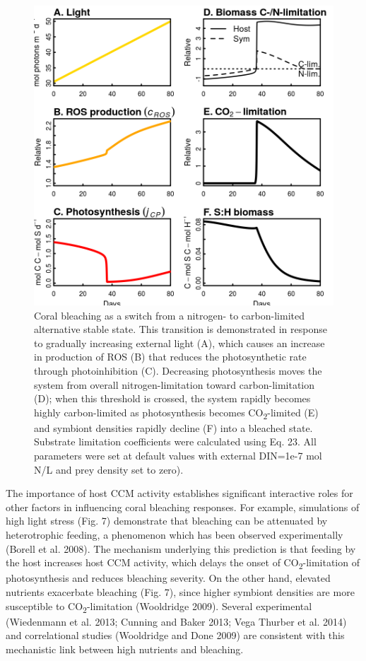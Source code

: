 \documentclass[]{elsarticle} %
\makeatletter
\def\maxwidth{\ifdim\Gin@nat@width>\linewidth\linewidth
\else\Gin@nat@width\fi}
\let\Oldincludegraphics\includegraphics
\renewcommand{\includegraphics}[1]{\Oldincludegraphics[width=\maxwidth]{#1}}
\makeatother
\begin{document}
\begin{figure}[htbp]
\centering
\includegraphics{../img/Fig6.png}
\caption{Coral bleaching as a switch from a nitrogen- to carbon-limited
alternative stable state. This transition is demonstrated in response to
gradually increasing external light (A), which causes an increase in
production of ROS (B) that reduces the photosynthetic rate through
photoinhibition (C). Decreasing photosynthesis moves the system from
overall nitrogen-limitation toward carbon-limitation (D); when this
threshold is crossed, the system rapidly becomes highly carbon-limited
as photosynthesis becomes CO\textsubscript{2}-limited (E) and symbiont
densities rapidly decline (F) into a bleached state. Substrate
limitation coefficients were calculated using Eq. 23. All parameters
were set at default values with external DIN=1e-7 mol N/L and prey
density set to zero).}
\end{figure}

The importance of host CCM activity establishes significant interactive
roles for other factors in influencing coral bleaching responses. For
example, simulations of high light stress (Fig. 7) demonstrate that
bleaching can be attenuated by heterotrophic feeding, a phenomenon which
has been observed experimentally (Borell et al. 2008). The mechanism
underlying this prediction is that feeding by the host increases host
CCM activity, which delays the onset of CO\textsubscript{2}-limitation
of photosynthesis and reduces bleaching severity. On the other hand,
elevated nutrients exacerbate bleaching (Fig. 7), since higher symbiont
densities are more susceptible to CO\textsubscript{2}-limitation
(Wooldridge 2009). Several experimental (Wiedenmann et al. 2013; Cunning
and Baker 2013; Vega Thurber et al. 2014) and correlational studies
(Wooldridge and Done 2009) are consistent with this mechanistic link
between high nutrients and bleaching.
\end{document}

